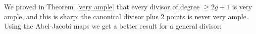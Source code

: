 %
%
%
%
%
We proved in Theorem~\ref{very ample} that every divisor of degree $\geq 2g+1$ is very ample, and this is sharp: the canonical divisor plus 2 points is never very ample. Using the Abel-Jacobi maps we get a better result for a general divisor:

